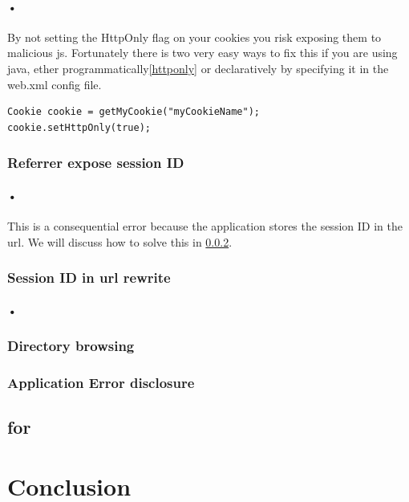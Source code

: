 \documentclass[11pt,english,a4paper]{report}
\begin{document}
\paragraph{•}
By not setting the HttpOnly flag on your cookies you risk exposing them to malicious \gls{js}.
Fortunately there is two very easy ways to fix this if you are using \gls{java}, ether programmatically\ref{httponly} or declaratively by specifying it in the web.xml config file.\cite{httponly}
\begin{lstlisting}[caption=Setting the HttpOnly Flag in Java,label=httponly]
Cookie cookie = getMyCookie("myCookieName");
cookie.setHttpOnly(true);
\end{lstlisting}


\subsubsection{Referrer expose session ID}
\paragraph{•}
This is a consequential error because the application stores the session ID in the \gls{url}.
We will discuss how to solve this in \ref{sec:sessionid}.

\subsubsection{Session ID in \gls{url} rewrite}
\label{sec:sessionid}
\paragraph{•}



\subsubsection{Directory browsing}

\subsubsection{Application Error disclosure}

\subsection{\gls{for}}
\section{Conclusion}

\newpage




\end{document}

